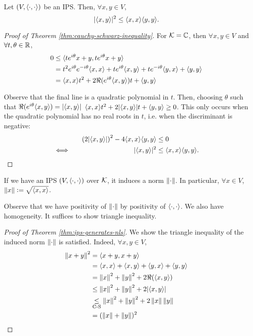 \begin{theorem}
\label{thm:cauchy-schwarz-inequality}
Let $(V, \langle \cdot, \cdot\rangle)$ be an IPS. Then, $\forall x, y \in V$, 
$$
|\langle x, y\rangle|^2 \leq \langle x, x\rangle\langle y, y\rangle.
$$
\end{theorem}

\begin{proof}[Proof of Theorem \ref{thm:cauchy-schwarz-inequality}]
For $\mathcal{K = \mathbb C}$, then $\forall x,y \in V$ and $\forall t, \theta \in \mathbb R$, 
\begin{align*}
    0 
        &\leq \langle te^{i\theta}x + y, te^{i\theta}x + y\rangle \\
        &= t^2e^{i\theta}e^{-i\theta}\langle x, x\rangle + te^{i\theta}\langle x, y\rangle + te^{-i\theta}\langle y, x\rangle + \langle y, y\rangle \\
        &= \langle x, x\rangle t^2 + 2\Re(e^{i\theta}\langle x, y\rangle)t + \langle y, y\rangle
\end{align*}

Observe that the final line is a quadratic polynomial in $t$. Then, choosing $\theta$ such that $\Re(e^{i\theta}\langle x, y\rangle) = |\langle x, y\rangle|$ $\langle x, x\rangle t^2 + 2|\langle x, y\rangle|t + \langle y, y\rangle \geq 0$. This only occurs when the quadratic polynomial has no real roots in $t$, i.e. when the discriminant is negative:
\begin{alignat*}{2}
    && \left(2|\langle x, y\rangle|\right)^2 - 4 \langle x, x\rangle\langle y, y\rangle &\leq 0 \\
    &\Longleftrightarrow \quad& |\langle x, y\rangle|^2 &\leq \langle x, x\rangle\langle y, y\rangle.
\end{alignat*}
\end{proof}

\begin{theorem}
\label{thm:ips-generates-nls}
If we have an IPS $(V, \langle \cdot, \cdot\rangle)$ over $\mathcal{K}$, it induces a norm $\left\lVert\cdot\right\rVert$. In particular, $\forall x \in V$, $\left\lVert x\right\rVert \vcentcolon= \sqrt{\langle x, x\rangle}$.
\end{theorem}

Observe that we have positivity of $\left\lVert\cdot\right\rVert$ by positivity of $\langle \cdot, \cdot\rangle$. We also have homogeneity. It suffices to show triangle inequality.

\begin{proof}[Proof of Theorem \ref{thm:ips-generates-nls}]
We show the triangle inequality of the induced norm $\left\lVert\cdot\right\rVert$ is satisfied. Indeed, $\forall x,y \in V$,
\begin{align*}
    \left\lVert x+y\right\rVert^2 
        &= \langle x+y, x+y\rangle \\
        &= \langle x, x\rangle + \langle x, y\rangle + \langle y, x\rangle + \langle y, y\rangle \\
        &= \left\lVert x\right\rVert^2 + \left\lVert y\right\rVert^2 + 2\Re(\langle x, y\rangle) \\
        &\leq \left\lVert x\right\rVert^2 + \left\lVert y\right\rVert^2 + 2|\langle x, y\rangle| \\
        &\underset{\text{C-S}}{\leq} \left\lVert x\right\rVert^2 + \left\lVert y\right\rVert^2 + 2\left\lVert x\right\rVert\left\lVert y\right\rVert \\
        &= (\left\lVert x\right\rVert+\left\lVert y\right\rVert)^2
\end{align*}
\end{proof} 

